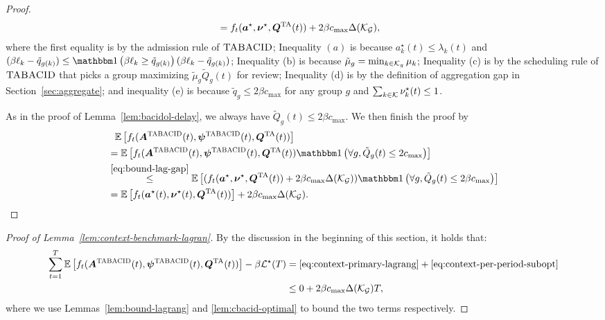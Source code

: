 \begin{proof}
\begin{align}
&= f_t(\boldsymbol{a}^\star,\boldsymbol{\nu}^\star, \boldsymbol{Q}^{\mathrm{TA}}(t)) + 2\beta c_{\max}\Delta(\mathcal{K}_{\mathcal{G}}), \label{eq:bound-lag-gap}
\end{align}
where the first equality is by the admission rule of $\textsc{TABACID}$; Inequality $(a)$ is because $a_k^\star(t) \leq \lambda_k(t)$ and $(\beta \ell_k-\tilde{q}_{g(k)}) \leq \indic{\beta \ell_k\geq\tilde{q}_{g(k)}}(\beta \ell_k-\tilde{q}_{g(k)})$; Inequality (b) is because $\tilde{\mu}_g = \min_{k \in \mathcal{K}_g} \mu_k$; Inequality (c) is by the scheduling rule of $\textsc{TABACID}$ that picks a group maximizing $\tilde{\mu}_g\tilde{Q}_g(t)$ for review; Inequality (d) is by the definition of aggregation gap in Section~\ref{sec:aggregate}; and inequality (e) is because $\tilde{q}_g \leq 2\beta c_{\max}$ for any group $g$ and $\sum_{k \in \mathcal{K}} \nu^\star_k(t) \leq 1$. 

As in the proof of Lemma~\ref{lem:bacidol-delay}, we always have $\tilde{Q}_g(t) \leq 2\beta c_{\max}$. We then finish the proof by
\begin{align*}
&\hspace{0.1in}\expect{f_t(\bolds{A}^{\tabacid}(t),\bolds{\psi}^{\tabacid}(t),\bolds{Q}^{\ta}(t))} \\
&= \expect{f_t(\bolds{A}^{\tabacid}(t),\bolds{\psi}^{\tabacid}(t),\bolds{Q}^{\ta}(t))\indic{\forall g,\tilde{Q}_g(t) \leq 2c_{\max}}}  \\
&\overset{\eqref{eq:bound-lag-gap}}{\leq} \expect{(f_t(\bolds{a}^\star,\bolds{\nu}^\star, \bolds{Q}^{\ta}(t)) + 2\beta c_{\max}\Delta(\set{K}_{\set{G}}))\indic{\forall g, \tilde{Q}_g(t) \leq 2\beta c_{\max}}} \\
&= \expect{f_t(\bolds{a}^\star(t),\bolds{\nu}^\star(t),\bolds{Q}^{\ta}(t))} + 2\beta c_{\max}\Delta(\set{K}_{\set{G}}).
\end{align*}
\end{proof}
\begin{proof}[Proof of Lemma~\ref{lem:context-benchmark-lagran}]
By the discussion in the beginning of this section, it holds that: 
\begin{align*}
\sum_{t=1}^T \mathbb E\left[f_t(\boldsymbol{A}^{\textsc{TABACID}}(t),\boldsymbol{\psi}^{\textsc{TABACID}}(t),\boldsymbol{Q}^{\mathrm{TA}}(t))\right] - \beta\mathcal{L}^\star(T) &= \eqref{eq:context-primary-lagrang} + \eqref{eq:context-per-period-subopt} \\
&\leq 0 + 2\beta c_{\max}\Delta(\mathcal{K}_{\mathcal{G}})T,
\end{align*}
where we use Lemmas~\ref{lem:bound-lagrang} and \ref{lem:cbacid-optimal} to bound the two terms respectively.
\end{proof}

